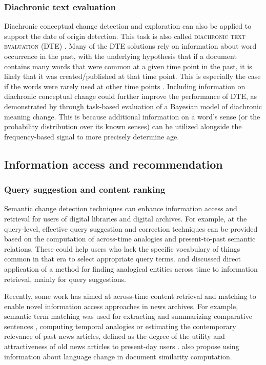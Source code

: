 \documentclass[output=paper%
]{langsci/langscibook}
\begin{document}
\subsubsection{Diachronic text evaluation} 
Diachronic conceptual change detection and exploration can also be  applied to support the date of origin detection. This task is also called \textsc{diachronic text evaluation} (DTE) \citep{popescu2015semeval}. Many of the DTE solutions rely on  information about word occurrence in the past, with the underlying hypothesis that if a document contains many words that were common at a given time point in the past, it is likely that it was created/published at that time point. This is especially the case if the words were rarely used at other time points \citep[see, e.g.][]{kanhabua2009using, chambers2012labeling,szymanski2015ucd,jatowt2017}. Including information on diachronic conceptual change could further improve the performance of DTE, as demonstrated by \citet{frermann-lapata-2016-bayesian} through task-based evaluation of a Bayesian model of diachronic meaning change. This is because additional information on a word's sense (or the probability distribution over its known senses) can be utilized alongside the frequency-based signal to more precisely determine age.

\subsection{Information access and recommendation}\label{sec9:iar}
\subsubsection{Query suggestion and content ranking} 
Semantic change detection techniques can enhance information access and retrieval for users of digital libraries and digital archives. For example, at the query-level, effective query suggestion and correction techniques can be provided based on the computation of across-time analogies and present-to-past semantic relations. These could help users who lack the specific vocabulary of things common in that era to select appropriate query terms. \citet{berberichbsw09} and \citet{holzmann2012fokas} discussed direct application of a method for finding analogical entities across time to information retrieval, mainly for query suggestions. 

Recently, some work has aimed at across-time content retrieval and matching to enable novel information access approaches in news archives. For example, semantic term matching was used for extracting and summarizing comparative sentences \citep{duan2019across}, computing temporal analogies \citep{zhang-etal-2015-omnia,szymanski:2017} or estimating the contemporary relevance of past news articles, defined as the degree of the utility and attractiveness of old news articles to present-day users \citep{mari}. \citet{morsy2016accounting} also propose using information about language change in document similarity computation.
\end{document}
